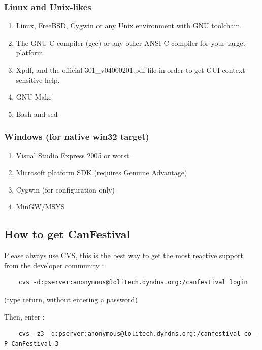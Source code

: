 \documentclass[12pt,english,a4paper]{book}
\begin{document}
\subsubsection{Linux and Unix-likes}

\begin{enumerate}
\item Linux, FreeBSD, Cygwin or any Unix environment with GNU toolchain. 
\item The GNU C compiler (gcc) or any other ANSI-C compiler for your target
platform. 
\item Xpdf, and the official 301\_v04000201.pdf file in order to get GUI
context sensitive help. 
\item GNU Make 
\item Bash and sed 
\end{enumerate}

\subsubsection{Windows (for native win32 target)}

\begin{enumerate}
\item Visual Studio Express 2005 or worst.
\item Microsoft platform SDK (requires Genuine Advantage)
\item Cygwin (for configuration only)
\item MinGW/MSYS
\end{enumerate}

\subsection{How to get CanFestival}

Please always use CVS, this is the best way to get the most reactive
support from the developer community :


\begin{verbatim}
	cvs -d:pserver:anonymous@lolitech.dyndns.org:/canfestival login
\end{verbatim}

(type return, without entering a password)

Then, enter :

\begin{verbatim}
	cvs -z3 -d:pserver:anonymous@lolitech.dyndns.org:/canfestival co -P CanFestival-3
\end{verbatim}
\end{document}
